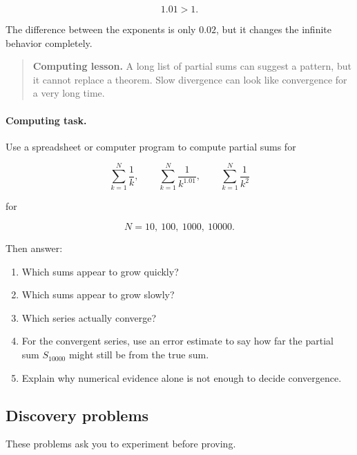 \[
1.01>1.
\]

The difference between the exponents is only \(0.02\), but it changes the infinite
behavior completely.

\begin{quote}
\textbf{Computing lesson.}
A long list of partial sums can suggest a pattern, but it cannot replace a theorem.
Slow divergence can look like convergence for a very long time.
\end{quote}

\paragraph{Computing task.}
Use a spreadsheet or computer program to compute partial sums for

\[
\sum_{k=1}^{N}\frac1{k},
\qquad
\sum_{k=1}^{N}\frac1{k^{1.01}},
\qquad
\sum_{k=1}^{N}\frac1{k^2}
\]

for

\[
N=10,\ 100,\ 1000,\ 10000.
\]

Then answer:

\begin{enumerate}
\item Which sums appear to grow quickly?

\item Which sums appear to grow slowly?

\item Which series actually converge?

\item For the convergent series, use an error estimate to say how far the partial sum
\(S_{10000}\) might still be from the true sum.

\item Explain why numerical evidence alone is not enough to decide convergence.
\end{enumerate}

\subsection{Discovery problems}
\label{subsec:series-discovery-problems}

These problems ask you to experiment before proving.

